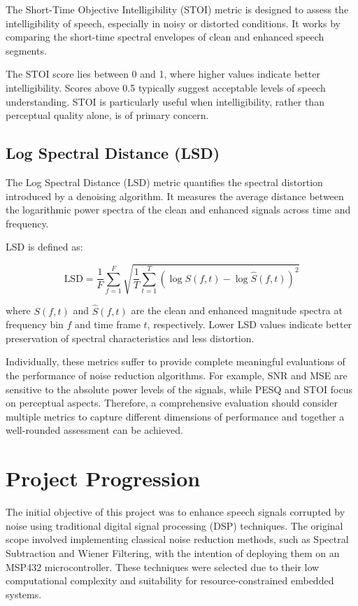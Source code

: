 The Short-Time Objective Intelligibility (STOI) metric is designed to assess the intelligibility of speech, especially in noisy or distorted conditions. It works by comparing the short-time spectral envelopes of clean and enhanced speech segments.

The STOI score lies between 0 and 1, where higher values indicate better intelligibility. Scores above 0.5 typically suggest acceptable levels of speech understanding. STOI is particularly useful when intelligibility, rather than perceptual quality alone, is of primary concern.

\subsection{Log Spectral Distance (LSD)}
\label{subsec:lsd}

The Log Spectral Distance (LSD) metric quantifies the spectral distortion introduced by a denoising algorithm. It measures the average distance between the logarithmic power spectra of the clean and enhanced signals across time and frequency.

LSD is defined as:

\begin{equation}
    \text{LSD} = \frac{1}{F} \sum_{f=1}^{F} \sqrt{ \frac{1}{T} \sum_{t=1}^{T} \left( \log S(f, t) - \log \hat{S}(f, t) \right)^2 }
\end{equation}

where \( S(f, t) \) and \( \hat{S}(f, t) \) are the clean and enhanced magnitude spectra at frequency bin \( f \) and time frame \( t \), respectively. Lower LSD values indicate better preservation of spectral characteristics and less distortion.

\vspace{2em}
Individually, these metrics suffer to provide complete meaningful evaluations of the performance of noise reduction algorithms. For example, SNR and MSE are sensitive to the absolute power levels of the signals, while PESQ and STOI focus on perceptual aspects. Therefore, a comprehensive evaluation should consider multiple metrics to capture different dimensions of performance and together a well-rounded assessment can be achieved.


\section{Project Progression}
\label{sec:project_progression}

The initial objective of this project was to enhance speech signals corrupted by noise using traditional digital signal processing (DSP) techniques. The original scope involved implementing classical noise reduction methods, such as Spectral Subtraction and Wiener Filtering, with the intention of deploying them on an MSP432 microcontroller. These techniques were selected due to their low computational complexity and suitability for resource-constrained embedded systems.


